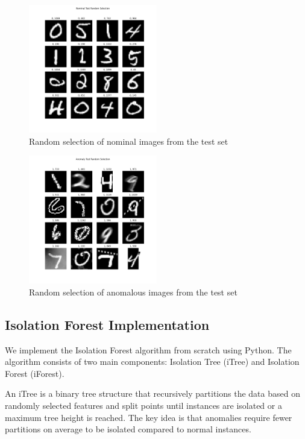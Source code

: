 \begin{figure}[htbp]
\centering
\includegraphics[width=0.5\textwidth]{resources/images/_nominal_test_random_selection.png}
\caption{Random selection of nominal images from the test set}
\label{fig:nominal_test}
\end{figure}

\begin{figure}[htbp]
\centering
\includegraphics[width=0.5\textwidth]{resources/images/_anomaly_test_random_selection.png}
\caption{Random selection of anomalous images from the test set}
\label{fig:anomaly_test}
\end{figure}

\subsection{Isolation Forest Implementation}
We implement the Isolation Forest algorithm from scratch using Python. The algorithm consists of two main components: Isolation Tree (iTree) and Isolation Forest (iForest).

An iTree is a binary tree structure that recursively partitions the data based on randomly selected features and split points until instances are isolated or a maximum tree height is reached. The key idea is that anomalies require fewer partitions on average to be isolated compared to normal instances.

